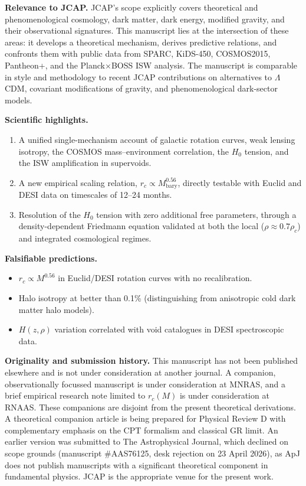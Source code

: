 \documentclass[12pt]{article}
\begin{document}
\textbf{Relevance to JCAP.}
JCAP's scope explicitly covers theoretical and phenomenological
cosmology, dark matter, dark energy, modified gravity, and their
observational signatures. This manuscript lies at the intersection of
these areas: it develops a theoretical mechanism, derives predictive
relations, and confronts them with public data from SPARC, KiDS-450,
COSMOS2015, Pantheon+, and the Planck$\times$BOSS ISW analysis. The
manuscript is comparable in style and methodology to recent JCAP
contributions on alternatives to $\Lambda$CDM, covariant modifications
of gravity, and phenomenological dark-sector models.

\bigskip

\textbf{Scientific highlights.}
\begin{enumerate}
  \item A unified single-mechanism account of galactic rotation
    curves, weak lensing isotropy, the COSMOS mass--environment
    correlation, the $H_0$ tension, and the ISW amplification in
    supervoids.
  \item A new empirical scaling relation, $r_c \propto
    M_\mathrm{bary}^{0.56}$, directly testable with Euclid and DESI
    data on timescales of 12--24 months.
  \item Resolution of the $H_0$ tension with zero additional free
    parameters, through a density-dependent Friedmann equation
    validated at both the local ($\rho \approx 0.7 \rho_c$) and
    integrated cosmological regimes.
\end{enumerate}

\bigskip

\textbf{Falsifiable predictions.}
\begin{itemize}
  \item $r_c \propto M^{0.56}$ in Euclid/DESI rotation curves with no
    recalibration.
  \item Halo isotropy at better than 0.1\% (distinguishing from
    anisotropic cold dark matter halo models).
  \item $H(z,\rho)$ variation correlated with void catalogues in DESI
    spectroscopic data.
\end{itemize}

\bigskip

\textbf{Originality and submission history.}
This manuscript has not been published elsewhere and is not under
consideration at another journal. A companion, observationally
focussed manuscript is under consideration at MNRAS, and a brief
empirical research note limited to $r_c(M)$ is under consideration at
RNAAS. These companions are disjoint from the present theoretical
derivations. A theoretical companion article is being prepared for
Physical Review D with complementary emphasis on the CPT formalism
and classical GR limit. An earlier version was submitted to The
Astrophysical Journal, which declined on scope grounds (manuscript
\#AAS76125, desk rejection on 23 April 2026), as ApJ does not publish
manuscripts with a significant theoretical component in fundamental
physics. JCAP is the appropriate venue for the present work.
\end{document}

